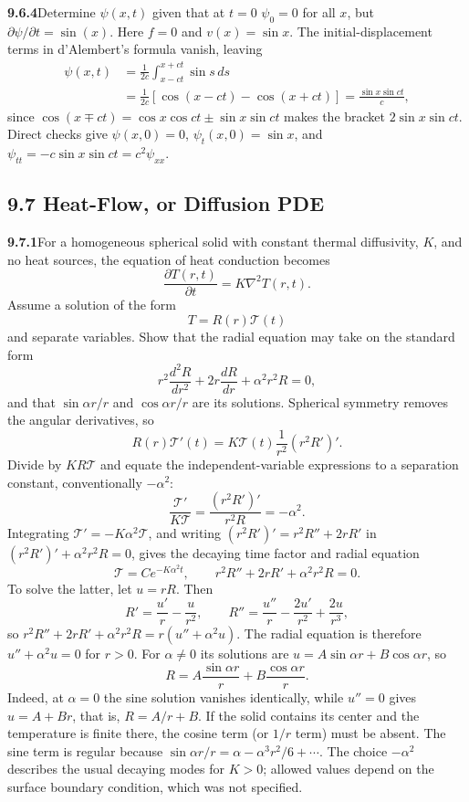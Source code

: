\par\bigskip
\noindent\textbf{9.6.4}\quad Determine $\psi(x,t)$ given that at $t=0$
$\psi_{0}=0$ for all $x$, but $\partial\psi/\partial t=\sin(x)$.
\solution
Here $f=0$ and $v(x)=\sin x$.  The initial-displacement terms in
d'Alembert's formula vanish, leaving
\begin{align*}
\psi(x,t)&=\frac1{2c}\int_{x-ct}^{x+ct}\sin s\,ds\\
&=\frac1{2c}[\cos(x-ct)-\cos(x+ct)]
=\boxed{\frac{\sin x\sin ct}{c}},
\end{align*}
since $\cos(x\mp ct)=\cos x\cos ct\pm\sin x\sin ct$ makes the
bracket $2\sin x\sin ct$.  Direct checks give $\psi(x,0)=0$,
$\psi_t(x,0)=\sin x$, and
$\psi_{tt}=-c\sin x\sin ct=c^2\psi_{xx}$.


\subsection*{9.7 Heat-Flow, or Diffusion PDE}

\par\bigskip
\noindent\textbf{9.7.1}\quad For a homogeneous spherical solid with constant
thermal diffusivity, $K$, and no heat sources, the equation of heat conduction
becomes
\[
\frac{\partial T(r,t)}{\partial t}=K\nabla^{2}T(r,t).
\]
Assume a solution of the form
\[
T=R(r)\mathcal{T}(t)
\]
and separate variables. Show that the radial equation may take on the standard
form
\[
r^{2}\frac{d^{2}R}{dr^{2}}+2r\frac{dR}{dr}+\alpha^{2}r^{2}R=0,
\]
and that $\sin\alpha r/r$ and $\cos\alpha r/r$ are its solutions.
\solution
Spherical symmetry removes the angular derivatives, so
\[
R(r)\mathcal T'(t)
=K\mathcal T(t)\frac1{r^2}(r^2R')'.
\]
Divide by $KR\mathcal T$ and equate the independent-variable
expressions to a separation constant, conventionally $-\alpha^2$:
\[
\frac{\mathcal T'}{K\mathcal T}
=\frac{(r^2R')'}{r^2R}=-\alpha^2.
\]
Integrating $\mathcal T'=-K\alpha^2\mathcal T$, and writing
$(r^2R')'=r^2R''+2rR'$ in $(r^2R')'+\alpha^2r^2R=0$, gives the decaying
time factor and radial equation
\[
\mathcal T=C e^{-K\alpha^2t},\qquad
\boxed{r^2R''+2rR'+\alpha^2r^2R=0}.
\]
To solve the latter, let $u=rR$.  Then
\[
R'=\frac{u'}r-\frac u{r^2},\qquad
R''=\frac{u''}r-\frac{2u'}{r^2}+\frac{2u}{r^3},
\]
so $r^2R''+2rR'+\alpha^2r^2R=r(u''+\alpha^2u)$.
The radial equation is therefore $u''+\alpha^2u=0$ for $r>0$.
For $\alpha\ne0$ its solutions are $u=A\sin\alpha r+B\cos\alpha r$, so
\[
\boxed{R=A\frac{\sin\alpha r}{r}
       +B\frac{\cos\alpha r}{r}}.
\]
Indeed, at $\alpha=0$ the sine solution vanishes identically, while
$u''=0$ gives $u=A+Br$, that is, $R=A/r+B$.
If the solid contains its center and the temperature is finite there,
the cosine term (or $1/r$ term) must be absent.  The sine term is
regular because $\sin\alpha r/r=\alpha-\alpha^3r^2/6+\cdots$.
The choice $-\alpha^2$ describes the usual decaying modes for $K>0$;
allowed values depend on the surface boundary condition, which was
not specified.


